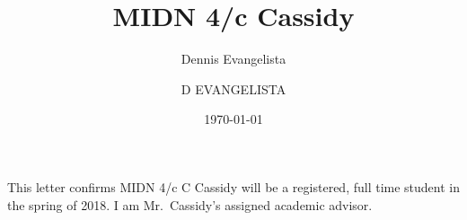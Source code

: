 \documentclass[12pt,courier]{navyletter}
\author{Dennis Evangelista}
\title{MIDN 4/c Cassidy}
\date{\today}
\begin{document}
\makedateblock{}

\begin{navyletterheader}
\navyskip{}%
\navysubjline%
\end{navyletterheader}

\section{}
This letter confirms MIDN 4/c C Cassidy will be a registered, full time student in the spring of 2018. I am Mr.~Cassidy's assigned academic advisor.  

\noclosing{}\\
\noindent\hspace*{4in}
\signature{D EVANGELISTA}

\end{document}
